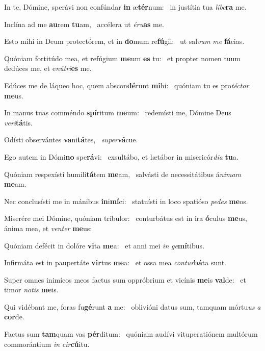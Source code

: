 \item In te, Dómine, sperávi non confúndar \textbf{in} æ\textbf{tér}num:~\psstar{} in justítia tua \textit{líbe}\textbf{ra} me.
\item Inclína ad me \textbf{au}rem \textbf{tu}am,~\psstar{} accélera ut \textit{éru}\textbf{as} me.
\item Esto mihi in Deum protectórem, et in \textbf{do}mum re\textbf{fú}gii:~\psstar{} ut sal\textit{vum} \textit{me} \textbf{fá}cias.
\item Quóniam fortitúdo mea, et refúgium \textbf{me}um \textbf{es} tu:~\psstar{} et propter nomen tuum dedúces me, et e\textit{nútri}\textbf{es} me.
\item Edúces me de láqueo hoc, quem abscon\textbf{dé}runt \textbf{mi}hi:~\psstar{} quóniam tu es pro\textit{téctor} \textbf{me}us.
\item In manus tuas comméndo \textbf{spí}ritum \textbf{me}um:~\psstar{} redemísti me, Dómine Deus \textit{veri}\textbf{tá}tis.
\item Odísti observántes \textbf{va}ni\textbf{tá}tes,~\psstar{} \textit{super}\textbf{vá}cue.
\item Ego autem in Dómi\textbf{no} spe\textbf{rá}vi:~\psstar{} exsultábo, et lætábor in misericór\textit{dia} \textbf{tu}a.
\item Quóniam respexísti humili\textbf{tá}tem \textbf{me}am,~\psstar{} salvásti de necessitátibus á\textit{nimam} \textbf{me}am.
\item Nec conclusísti me in mánibus \textbf{in}i\textbf{mí}ci:~\psstar{} statuísti in loco spatióso \textit{pedes} \textbf{me}os.
\item Miserére mei Dómine, quóniam tríbulor:~\pscross{} conturbátus est in ira \textbf{ó}culus \textbf{me}us,~\psstar{} ánima mea, et \textit{venter} \textbf{me}us:
\item Quóniam defécit in dolóre \textbf{vi}ta \textbf{me}a:~\psstar{} et anni mei \textit{in} \textit{ge}\textbf{mí}tibus.
\item Infirmáta est in paupertáte \textbf{vir}tus \textbf{me}a:~\psstar{} et ossa mea \textit{contur}\textbf{bá}ta sunt.
\item Super omnes inimícos meos factus sum oppróbrium et vicínis \textbf{me}is \textbf{val}de:~\psstar{} et timor \textit{notis} \textbf{me}is.
\item Qui vidébant me, foras fu\textbf{gé}runt \textbf{a} me:~\psstar{} oblivióni datus sum, tamquam mórtu\textit{us} \textit{a} \textbf{cor}de.
\item Factus sum \textbf{tam}quam vas \textbf{pér}ditum:~\psstar{} quóniam audívi vituperatiónem multórum commorántium \textit{in} \textit{cir}\textbf{cú}itu.
